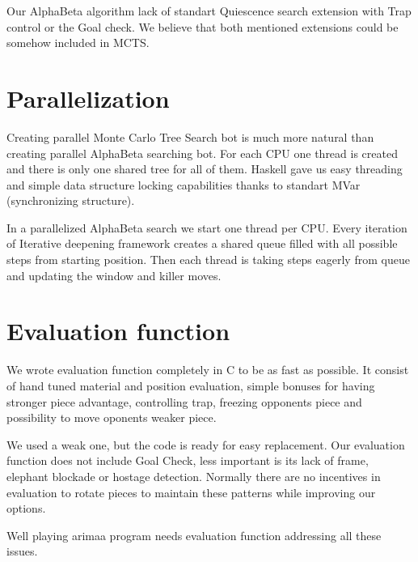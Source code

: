 Our AlphaBeta algorithm lack of standart \ac{Quiescence} search extension with
Trap control or the \ac{Goal check}. We believe that both mentioned extensions
could be somehow included in MCTS.

\section{Parallelization}
Creating parallel Monte Carlo Tree Search bot is much more natural than
creating parallel AlphaBeta searching bot. For each CPU one thread is created
and there is only one shared tree for all of them. Haskell gave us easy
threading and simple data structure locking capabilities thanks to standart
MVar (synchronizing structure).

In a parallelized AlphaBeta search we start one thread per CPU. Every iteration
of Iterative deepening framework creates a shared queue filled with all
possible steps from starting position. Then each thread is taking steps eagerly
from queue and updating the window and killer moves.

\section{Evaluation function}
We wrote evaluation function completely in C to be as fast as possible. It
consist of hand tuned material and position evaluation, simple bonuses for
having stronger piece advantage, controlling trap, freezing opponents piece and
possibility to move oponents weaker piece.

We used a weak one, but the code is ready for easy replacement. Our evaluation
function does not include Goal Check, less important is its lack of frame,
elephant blockade or hostage detection. Normally there are no incentives in
evaluation to rotate pieces to maintain these patterns while improving our
options.

Well playing arimaa program needs evaluation function addressing all these
issues.

